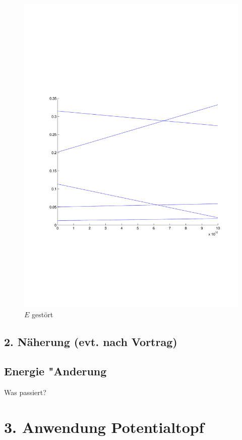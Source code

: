 \begin{refsection}
\begin{figure}
 \centering
 \includegraphics[width=12cm,clip=true,trim=2cm 7cm 1cm 8cm]{efeld/Energie_gestoert.pdf}
 \caption{$E$ gest\"ort}
 \label{abb:efeld_E_gestoert}
\end{figure}




\subsection{ 2. N\"aherung (evt. nach Vortrag) }

\subsection{ Energie "Anderung }

Was passiert?

\section{ 3. Anwendung Potentialtopf }


\end{refsection}
